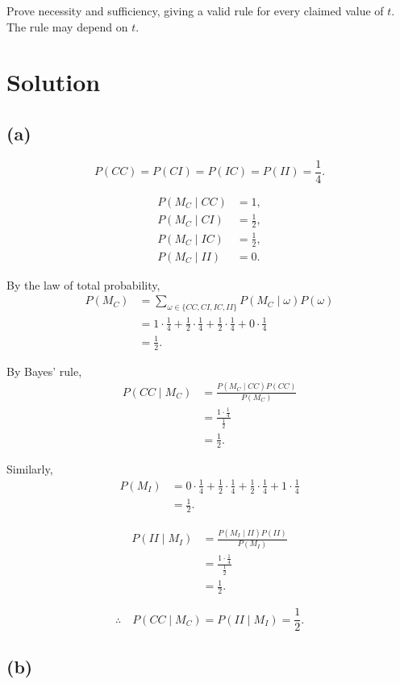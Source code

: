 \documentclass[11pt,a4paper]{article}
\begin{document}
Prove necessity and sufficiency, giving a valid rule
for every claimed value of $t$. The rule may depend on $t$.

\section*{Solution}

\subsection*{(a)}

\[
P(CC)=P(CI)=P(IC)=P(II)=\frac14.
\]

\[
\begin{aligned}
P(M_C\mid CC)&=1,\\
P(M_C\mid CI)&=\frac12,\\
P(M_C\mid IC)&=\frac12,\\
P(M_C\mid II)&=0.
\end{aligned}
\]

By the law of total probability,
\[
\begin{aligned}
P(M_C)
&=\sum_{\omega\in\{CC,CI,IC,II\}}
P(M_C\mid\omega)P(\omega)\\
&=1\cdot\frac14
+\frac12\cdot\frac14
+\frac12\cdot\frac14
+0\cdot\frac14\\
&=\frac12.
\end{aligned}
\]

By Bayes' rule,
\[
\begin{aligned}
P(CC\mid M_C)
&=\frac{P(M_C\mid CC)P(CC)}{P(M_C)}\\
&=\frac{1\cdot\frac14}{\frac12}\\
&=\frac12.
\end{aligned}
\]

Similarly,
\[
\begin{aligned}
P(M_I)
&=0\cdot\frac14
+\frac12\cdot\frac14
+\frac12\cdot\frac14
+1\cdot\frac14\\
&=\frac12.
\end{aligned}
\]

\[
\begin{aligned}
P(II\mid M_I)
&=\frac{P(M_I\mid II)P(II)}{P(M_I)}\\
&=\frac{1\cdot\frac14}{\frac12}\\
&=\frac12.
\end{aligned}
\]

\[
\therefore\quad
P(CC\mid M_C)=P(II\mid M_I)=\frac12.
\]


\subsection*{(b)}
\end{document}
